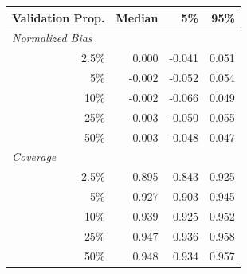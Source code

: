 
\begin{tabular}{r|rrr}
\toprule
Validation Prop. & Median & 5\% & 95\%\\
\midrule
\multicolumn{1}{l|}{\textit{Normalized Bias}}\\
2.5\% & 0.000 & -0.041 & 0.051\\
5\% & -0.002 & -0.052 & 0.054\\
10\% & -0.002 & -0.066 & 0.049\\
25\% & -0.003 & -0.050 & 0.055\\
50\% & 0.003 & -0.048 & 0.047\\
\midrule
%
\multicolumn{1}{l|}{\textit{Coverage}}\\
2.5\% & 0.895 & 0.843 & 0.925\\
5\% & 0.927 & 0.903 & 0.945\\
10\% & 0.939 & 0.925 & 0.952\\
25\% & 0.947 & 0.936 & 0.958\\
50\% & 0.948 & 0.934 & 0.957\\
\bottomrule
\end{tabular}
